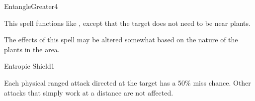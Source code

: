 \begin{spellsection}{Entangle}{Greater}{4}
\begin{spellheader}
\end{spellheader}
\begin{spellcontent}
    \begin{spelltargetinginfo}
    \end{spelltargetinginfo}
    \begin{spelleffects}
        \spellspecial This spell functions like , except that the target does not need to be near plants.
    \end{spelleffects}
\end{spellcontent}
\begin{spellfooter}
    \spellnotes The effects of this spell may be altered somewhat based on the nature of the plants in the area.
\end{spellfooter}
\end{spellsection}

\begin{spellsection}{Entropic Shield}{1}
\begin{spellheader}
\end{spellheader}
\begin{spellcontent}
    \begin{spelltargetinginfo}
    \end{spelltargetinginfo}
    \begin{spelleffects}
        \spelleffect Each physical ranged attack directed at the target has a 50\% miss chance. Other attacks that simply work at a distance are not affected.
        \spelldur \durshort \dismissable
    \end{spelleffects}
\end{spellcontent}
\begin{spellfooter}
\end{spellfooter}
\end{spellsection}

